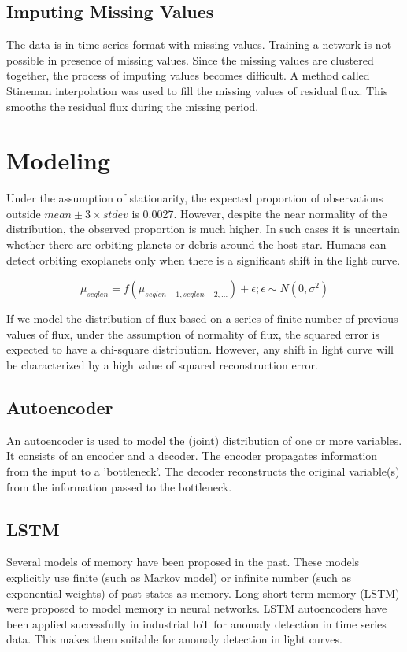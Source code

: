 \documentclass[%
aip,
amsmath,amssymb,
reprint,%
]{revtex4-1}
\begin{document}
\subsection{Imputing Missing Values}

The data is in time series format with missing values. Training a network is not possible in presence of missing values. Since the missing values are clustered together, the process of imputing values becomes difficult. A method called Stineman interpolation was used to fill the missing values of residual flux. This smooths the residual flux during the missing period.

\section{Modeling}

Under the assumption of stationarity, the expected proportion of observations outside $mean \pm 3 \times stdev$ is 0.0027. However, despite the near normality of the distribution, the observed proportion is much higher. In such cases it is uncertain whether there are orbiting planets or debris around the host star. Humans can detect orbiting exoplanets only when there is a significant shift in the light curve.

$$\mu_{seqlen} = f(\mu_{seqlen-1,seqlen-2, ...}) + \epsilon; \epsilon \sim N(0, \sigma^2)$$

If we model the distribution of flux based on a series of finite number of previous values of flux, under the assumption of normality of flux, the squared error is expected to have a chi-square distribution. However, any shift in light curve will be characterized by a high value of squared reconstruction error.

\subsection{Autoencoder}

An autoencoder is used to model the (joint) distribution of one or more variables. It consists of an encoder and a decoder. The encoder propagates information from the input to a 'bottleneck'. The decoder reconstructs the original variable(s) from the information passed to the bottleneck.

\subsection{LSTM}

Several models of memory have been proposed in the past. These models explicitly use finite (such as Markov model) or infinite number (such as exponential weights) of past states as memory. Long short term memory (LSTM) were proposed to model memory in neural networks. LSTM autoencoders have been applied successfully in industrial IoT for anomaly detection in time series data. This makes them suitable for anomaly detection in light curves.
\end{document}
